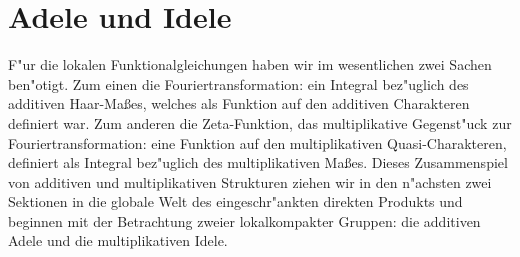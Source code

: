 \section{Adele und Idele}\label{sec:adeleidele} 
	F"ur die lokalen Funktionalgleichungen haben wir im wesentlichen zwei Sachen ben"otigt.
	Zum einen die Fouriertransformation: ein Integral bez"uglich des additiven Haar-Maßes, welches als Funktion auf den additiven Charakteren definiert war.
	Zum anderen die Zeta-Funktion, das multiplikative Gegenst"uck zur Fouriertransformation: eine Funktion auf den multiplikativen Quasi-Charakteren, definiert als Integral bez"uglich des multiplikativen Maßes.
	Dieses Zusammenspiel von additiven und multiplikativen Strukturen ziehen wir in den n"achsten zwei Sektionen in die globale Welt des eingeschr"ankten direkten Produkts und beginnen mit der Betrachtung zweier lokalkompakter Gruppen: die additiven Adele und die multiplikativen Idele.
